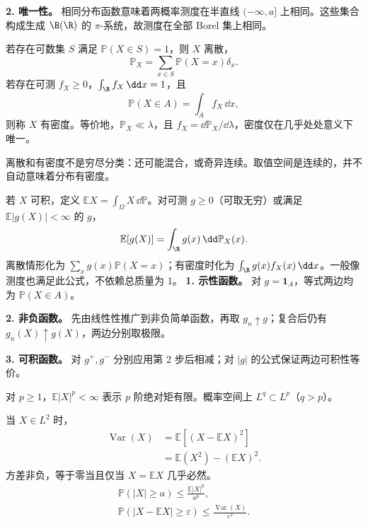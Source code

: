 \textbf{2. 唯一性。} 相同分布函数意味着两概率测度在半直线 $(-\infty,a]$ 上相同。这些集合构成生成 $\B(\R)$ 的 $\pi$-系统，故测度在全部 Borel 集上相同。

若存在可数集 $S$ 满足 $\mathbb P(X\in S)=1$，则 $X$ 离散，
\[
\mathbb P_X=\sum_{x\in S}\mathbb P(X=x)\delta_x.
\]
若存在可测 $f_X\ge0$，$\int_{\R}f_X\,\dd x=1$，且
\[
\mathbb P(X\in A)=\int_A f_X\,\dd x,
\]
则称 $X$ 有密度。等价地，$\mathbb P_X\ll\lambda$，且 $f_X=\dd\mathbb P_X/\dd\lambda$，密度仅在几乎处处意义下唯一。

离散和有密度不是穷尽分类：还可能混合，或奇异连续。取值空间是连续的，并不自动意味着分布有密度。

若 $X$ 可积，定义 $\mathbb E X=\int_\Omega X\,\dd\mathbb P$。对可测 $g\ge0$（可取无穷）或满足 $\mathbb E|g(X)|<\infty$ 的 $g$，
\[
\mathbb E[g(X)]=\int_{\R}g(x)\,\dd\mathbb P_X(x).
\]
离散情形化为 $\sum_x g(x)\mathbb P(X=x)$；有密度时化为 $\int_{\R}g(x)f_X(x)\,\dd x$。一般像测度也满足此公式，不依赖总质量为 $1$。
\textbf{1. 示性函数。} 对 $g=\mathbf1_A$，等式两边均为 $\mathbb P(X\in A)$。

\textbf{2. 非负函数。} 先由线性性推广到非负简单函数，再取 $g_n\uparrow g$；复合后仍有 $g_n(X)\uparrow g(X)$，两边分别取极限。

\textbf{3. 可积函数。} 对 $g^+,g^-$ 分别应用第 2 步后相减；对 $|g|$ 的公式保证两边可积性等价。

对 $p\ge1$，$\mathbb E|X|^p<\infty$ 表示 $p$ 阶绝对矩有限。概率空间上 $L^q\subset L^p$（$q>p$）。

当 $X\in L^2$ 时，
\[
\begin{aligned}
\operatorname{Var}(X)&=\mathbb E[(X-\mathbb EX)^2]\\
&=\mathbb E(X^2)-(\mathbb EX)^2.
\end{aligned}
\]
方差非负，等于零当且仅当 $X=\mathbb EX$ 几乎必然。
\[
\begin{gathered}
\mathbb P(|X|\ge a)\le\frac{\mathbb E|X|^p}{a^p},\\
\mathbb P(|X-\mathbb EX|\ge\varepsilon)
\le\frac{\operatorname{Var}(X)}{\varepsilon^2}.
\end{gathered}
\]

